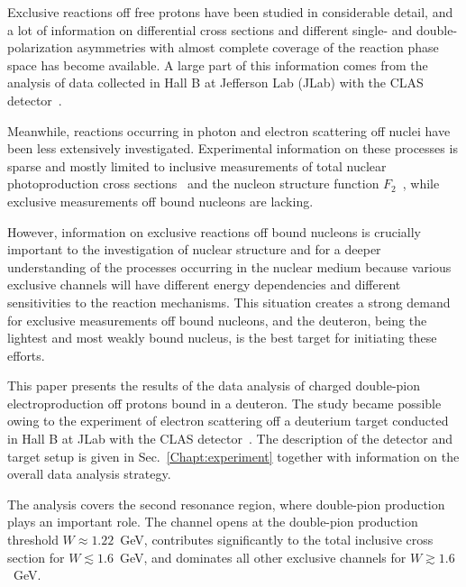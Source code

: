 \documentclass[prc,twocolumn,superscriptaddress,showpacs,amssymb,amsmath,amsfonts,aps,nofootinbib]{revtex4-1}
\begin{document}
Exclusive reactions off free protons have been studied in considerable detail, and a lot of information on differential cross sections and different single- and double-polarization asymmetries with almost complete coverage of the reaction phase space has become available. A large part of this information comes from the analysis of data collected in Hall B at Jefferson Lab (JLab) with the CLAS detector~\cite{Mecking:2003zu,CLAS_DB}.%


Meanwhile, reactions occurring in photon and electron scattering off nuclei have been less extensively investigated. Experimental information on these processes is sparse and mostly limited to inclusive measurements of total nuclear photoproduction cross sections~\cite{Mokeev:1995fy,Bianchi:1994ax,Ahrens:1986hn} and the nucleon structure function $F_{\text{2}}$~\cite{Osipenko_2005_note,Osipenko:2005gt,Osipenko:2010sb}, while exclusive measurements off bound nucleons are lacking.


However, information on exclusive reactions off bound nucleons is crucially important to the investigation of nuclear structure and for a deeper understanding of the processes occurring in the nuclear medium because various exclusive channels will have different energy dependencies and different sensitivities to the reaction mechanisms. This situation creates a strong demand for exclusive measurements off bound nucleons, and the deuteron, being the lightest and most weakly bound nucleus, is the best target for initiating these efforts.




This paper presents the results of the data analysis of charged double-pion electroproduction off protons bound in a deuteron. The study became possible owing to the experiment of electron scattering off a deuterium target conducted in Hall B at JLab with the CLAS detector~\cite{Mecking:2003zu}. The description of the detector and target setup is given in Sec.\!~\ref{Chapt:experiment} together with information on the overall data analysis strategy.  



The analysis covers the second resonance region, where double-pion production plays an important role. The channel opens at the double-pion production threshold $W \approx 1.22$~GeV, contributes significantly to the total inclusive cross section for $W \lesssim 1.6$~GeV, and dominates all other exclusive channels for $W \gtrsim 1.6$~GeV.
\end{document}
